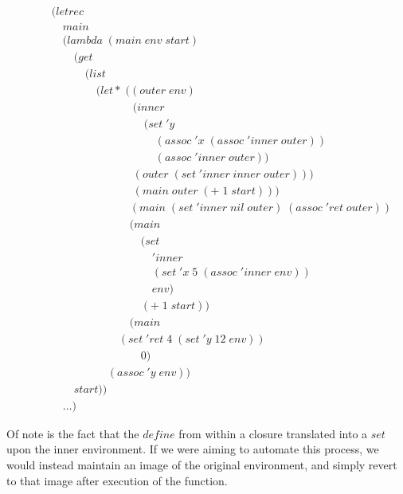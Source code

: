\begin{figure}[htp]
\footnotesize
\caption{}\label{fig:closureScope}
\begin{align*}
& (letrec \; 
\\& \quad main \; 
\\& \quad (lambda \; (main \; env \; start)
\\& \qquad (get \; 
\\& \qquad \quad (list \; 
\\& \qquad \qquad (let* \; ((outer \; env)
\\& \qquad \qquad \qquad \quad \; (inner \; 
\\& \qquad \qquad \qquad \qquad \; (set \; 'y \; 
\\& \qquad \qquad \qquad \qquad \quad \; (assoc \; 'x \; (assoc \; 'inner \; outer)) \; 
\\& \qquad \qquad \qquad \qquad \quad \; (assoc \; 'inner \; outer))
\\& \qquad \qquad \qquad \quad \; (outer \; (set \; 'inner \; inner \; outer)))
\\& \qquad \qquad \qquad \quad \; (main \; outer \; (+ \; 1 \; start)))
\\& \qquad \qquad \qquad \quad (main \; (set \; 'inner \; nil \; outer) \; (assoc \; 'ret \; outer))
\\& \qquad \qquad \qquad \quad (main \; 
\\& \qquad \qquad \qquad \qquad (set \; 
\\& \qquad \qquad \qquad \qquad \quad 'inner \; 
\\& \qquad \qquad \qquad \qquad \quad (set \; 'x \; 5 \; (assoc \; 'inner \; env)) \; 
\\& \qquad \qquad \qquad \qquad \quad env) \; 
\\& \qquad \qquad \qquad \qquad (+ \; 1 \; start))
\\& \qquad \qquad \qquad \quad (main \; 
\\& \qquad \qquad \qquad (set \; 'ret \; 4 \; (set \; 'y \; 12 \; env)) \; 
\\& \qquad \qquad \qquad \qquad 0)
\\& \qquad \qquad \quad (assoc \; 'y \; env)) \; 
\\& \qquad start))
\\& \quad \dots)
\end{align*}
\end{figure}

Of note is the fact that the $define$ from within a closure translated into a $set$
upon the inner environment. If we were aiming to automate this process, we would
instead maintain an image of the original environment, and simply revert to that 
image after execution of the function.

